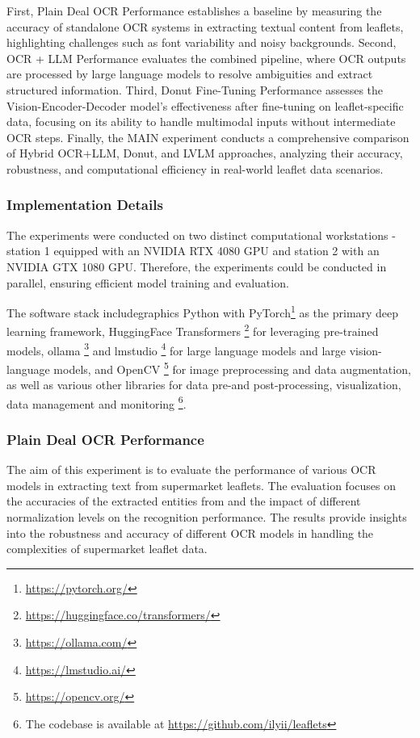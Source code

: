 \documentclass[11pt]{article}
\begin{document}
First, Plain Deal OCR Performance establishes a baseline by measuring the accuracy of standalone OCR systems in extracting textual content from leaflets, highlighting challenges such as font variability and noisy backgrounds. Second, OCR + LLM Performance evaluates the combined pipeline, where OCR outputs are processed by large language models to resolve ambiguities and extract structured information. Third, Donut Fine-Tuning Performance assesses the Vision-Encoder-Decoder model's effectiveness after fine-tuning on leaflet-specific data, focusing on its ability to handle multimodal inputs without intermediate OCR steps. Finally, the MAIN experiment conducts a comprehensive comparison of Hybrid OCR+LLM, Donut, and LVLM approaches, analyzing their accuracy, robustness, and computational efficiency in real-world leaflet data scenarios.


\subsubsection{Implementation Details}
The experiments were conducted on two distinct computational workstations - station 1 equipped with an NVIDIA RTX 4080 GPU and station 2 with an NVIDIA GTX 1080 GPU. Therefore, the experiments could be conducted in parallel, ensuring efficient model training and evaluation.

The software stack includegraphics Python with PyTorch\footnote{\href{https://pytorch.org/}{https://pytorch.org/}} as the primary deep learning framework, HuggingFace Transformers \footnote{\href{https://huggingface.co/transformers/}{https://huggingface.co/transformers/}}
for leveraging pre-trained models, ollama \footnote{\href{https://ollama.com/}{https://ollama.com/}}
and lmstudio \footnote{\href{https://lmstudio.ai/}{https://lmstudio.ai/}} for large language models and large vision-language models, and OpenCV \footnote{\href{https://opencv.org/}{https://opencv.org/}} for image preprocessing and data augmentation, as well as various other libraries for data pre-and post-processing, visualization, data management and monitoring \footnote{The codebase is available at \href{https://github.com/ilyii/leaflets}{https://github.com/ilyii/leaflets}}.


\subsubsection{Plain Deal OCR Performance}
The aim of this experiment is to evaluate the performance of various OCR models in extracting text from supermarket leaflets. The evaluation focuses on the accuracies of the extracted entities from  and the impact of different normalization levels on the recognition performance. The results provide insights into the robustness and accuracy of different OCR models in handling the complexities of supermarket leaflet data.
\end{document}
